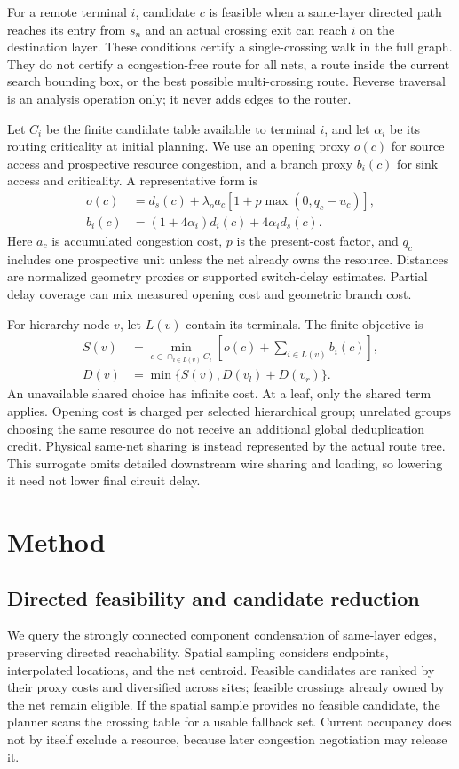 \documentclass[conference,10pt]{IEEEtran}
\begin{document}
For a remote terminal $i$, candidate $c$ is feasible when a same-layer directed path reaches its entry from $s_n$ and an actual crossing exit can reach $i$ on the destination layer. These conditions certify a single-crossing walk in the full graph. They do not certify a congestion-free route for all nets, a route inside the current search bounding box, or the best possible multi-crossing route. Reverse traversal is an analysis operation only; it never adds edges to the router.

Let $C_i$ be the finite candidate table available to terminal $i$, and let $\alpha_i$ be its routing criticality at initial planning. We use an opening proxy $o(c)$ for source access and prospective resource congestion, and a branch proxy $b_i(c)$ for sink access and criticality. A representative form is
\begin{align}
 o(c)&=d_s(c)+\lambda_o a_c[1+p\max(0,q_c-u_c)],\\
 b_i(c)&=(1+4\alpha_i)d_i(c)+4\alpha_i d_s(c).
\end{align}
Here $a_c$ is accumulated congestion cost, $p$ is the present-cost factor, and $q_c$ includes one prospective unit unless the net already owns the resource. Distances are normalized geometry proxies or supported switch-delay estimates. Partial delay coverage can mix measured opening cost and geometric branch cost.

For hierarchy node $v$, let $L(v)$ contain its terminals. The finite objective is
\begin{equation}
 \begin{aligned}
 S(v)&=\min_{c\in\cap_{i\in L(v)}C_i}\left[o(c)+\sum_{i\in L(v)}b_i(c)\right],\\
 D(v)&=\min\{S(v),D(v_l)+D(v_r)\}.
\end{aligned}
\end{equation}
An unavailable shared choice has infinite cost. At a leaf, only the shared term applies. Opening cost is charged per selected hierarchical group; unrelated groups choosing the same resource do not receive an additional global deduplication credit. Physical same-net sharing is instead represented by the actual route tree. This surrogate omits detailed downstream wire sharing and loading, so lowering it need not lower final circuit delay.

\section{Method}
\subsection{Directed feasibility and candidate reduction}
We query the strongly connected component condensation of same-layer edges, preserving directed reachability. Spatial sampling considers endpoints, interpolated locations, and the net centroid. Feasible candidates are ranked by their proxy costs and diversified across sites; feasible crossings already owned by the net remain eligible. If the spatial sample provides no feasible candidate, the planner scans the crossing table for a usable fallback set. Current occupancy does not by itself exclude a resource, because later congestion negotiation may release it.
\end{document}
